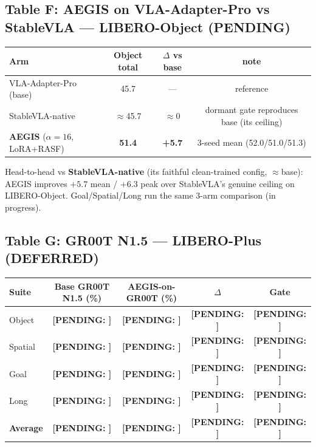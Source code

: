 \documentclass[11pt,a4paper]{article}
\newcommand{\pending}[1]{{\color{pendingcolor}\textbf{[PENDING: #1]}}}
\begin{document}
\subsection*{Table F: AEGIS on VLA-Adapter-Pro vs StableVLA — LIBERO-Object (PENDING)}

\begin{table}[H]
\centering
\small
\begin{tabular}{lccc}
\toprule
Arm & Object total & $\Delta$ vs base & note \\
\midrule
VLA-Adapter-Pro (base)        & 45.7 & — & reference \\
StableVLA-native & $\approx$45.7 & $\approx 0$ & dormant gate reproduces base (its ceiling) \\
\textbf{AEGIS} ($\alpha=16$, LoRA+RASF) & \textbf{51.4} & \textbf{+5.7} & 3-seed mean (52.0/51.0/51.3) \\
\bottomrule
\end{tabular}
\end{table}
{\small Head-to-head vs \textbf{StableVLA-native} (its faithful clean-trained config, $\approx$base):
AEGIS improves $+5.7$ mean / $+6.3$ peak over StableVLA's genuine ceiling on LIBERO-Object.
Goal/Spatial/Long run the same 3-arm comparison (in progress).}

\subsection*{Table G: GR00T N1.5 — LIBERO-Plus (DEFERRED)}

\begin{table}[H]
\centering
\small
\begin{tabular}{lcccc}
\toprule
Suite & Base GR00T N1.5 (\%) & AEGIS-on-GR00T (\%) & $\Delta$ & Gate \\
\midrule
Object  & \pending{} & \pending{} & \pending{} & \pending{} \\
Spatial & \pending{} & \pending{} & \pending{} & \pending{} \\
Goal    & \pending{} & \pending{} & \pending{} & \pending{} \\
Long    & \pending{} & \pending{} & \pending{} & \pending{} \\
\midrule
\textbf{Average} & \pending{} & \pending{} & \pending{} & \pending{} \\
\bottomrule
\end{tabular}
\end{table}

\end{document}
